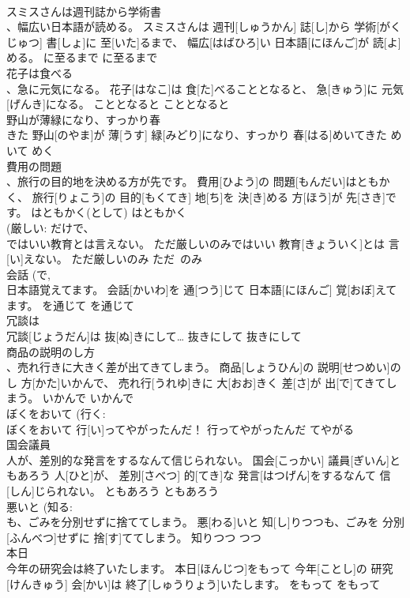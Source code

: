 \documentclass[8pt]{extreport}
\begin{document}
\begin{CJK}{UTF8}{min}
\\	スミスさんは週刊誌から学術書　
\\	、幅広い日本語が読める。	スミスさんは 週刊[しゅうかん] 誌[し]から 学術[がくじゅつ] 書[しょ]に 至[いた]るまで、 幅広[はばひろ]い 日本語[にほんご]が 読[よ]める。	に至るまで	に至るまで	
\\	花子は食べる 
\\	、急に元気になる。	花子[はなこ]は 食[た]べることとなると、 急[きゅう]に 元気[げんき]になる。	こととなると	こととなると	
\\	野山が薄緑になり、すっかり春 
\\	きた	野山[のやま]が 薄[うす] 緑[みどり]になり、すっかり 春[はる]めいてきた	めいて	めく	
\\	費用の問題 
\\	、旅行の目的地を決める方が先です。	費用[ひよう]の 問題[もんだい]はともかく、 旅行[りょこう]の 目的[もくてき] 地[ち]を 決[き]める 方[ほう]が 先[さき]です。	はともかく(として)	はともかく	
\\	(厳しい: だけで、
\\	ではいい教育とは言えない。	ただ厳しいのみではいい 教育[きょういく]とは 言[い]えない。	ただ厳しいのみ	ただ~のみ	
\\	会話 (で, 
\\	日本語覚えてます。	会話[かいわ]を 通[つう]じて 日本語[にほんご] 覚[おぼ]えてます。	を通じて	を通じて	
\\	冗談は 
\\	冗談[じょうだん]は 抜[ぬ]きにして…	抜きにして	抜きにして	
\\	商品の説明のし方 
\\	、売れ行きに大きく差が出てきてしまう。	商品[しょうひん]の 説明[せつめい]のし 方[かた]いかんで、 売れ行[うれゆ]きに 大[おお]きく 差[さ]が 出[で]てきてしまう。	いかんで	いかんで	
\\	ぼくをおいて (行く: 
\\	ぼくをおいて 行[い]ってやがったんだ！	行ってやがったんだ	てやがる	
\\	国会議員 
\\	人が、差別的な発言をするなんて信じられない。	国会[こっかい] 議員[ぎいん]ともあろう 人[ひと]が、 差別[さべつ] 的[てき]な 発言[はつげん]をするなんて 信[しん]じられない。	ともあろう	ともあろう	
\\	悪いと (知る: 
\\	も、ごみを分別せずに捨ててしまう。	悪[わる]いと 知[し]りつつも、ごみを 分別[ふんべつ]せずに 捨[す]ててしまう。	知りつつ	つつ	
\\	本日 
\\	今年の研究会は終了いたします。	本日[ほんじつ]をもって 今年[ことし]の 研究[けんきゅう] 会[かい]は 終了[しゅうりょう]いたします。	をもって	をもって	

\end{CJK}
\end{document}
